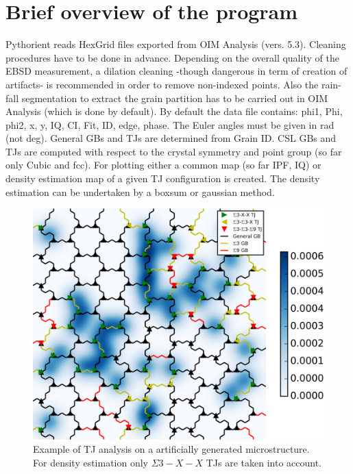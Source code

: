 \documentclass{article}
\begin{document}
\section{Brief overview of the program}
Pythorient reads HexGrid files exported from OIM Analysis (vers. 5.3). Cleaning procedures have to be done in advance. Depending on the overall quality of the EBSD measurement, a dilation cleaning -though dangerous in term of creation of artifacts- is recommended in order to remove non-indexed points. Also the rain-fall segmentation to extract the grain partition has to be carried out in OIM Analysis (which is done by default). By default the data file contains:   phi1, Phi, phi2, x, y, IQ, CI, Fit, ID, edge, phase. The Euler angles must be given in rad (not deg). General GBs and TJs are determined from Grain ID. CSL GBs and TJs are computed with respect to the crystal symmetry and point group (so far only Cubic and fcc). For plotting either a common map (so far IPF, IQ) or density estimation map of a given TJ configuration is created. The density estimation can be undertaken by a boxsum or gaussian method.
\begin{figure}[ht]
\centering
\includegraphics[width=\linewidth]{figs/Generated_OIM}
\caption{Example of TJ analysis on a artificially generated microstructure. For density estimation only $\Sigma3-X-X$ TJs are taken into account.}
\label{fig:generated}
\end{figure}
\end{document}
